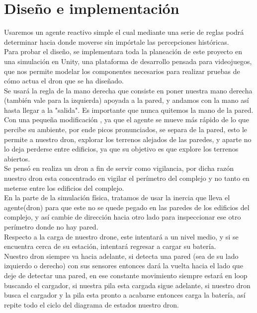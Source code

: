 \documentclass[12pt]{article}
\begin{document}
\section{Diseño e implementación}

Usaremos un agente reactivo simple el cual mediante una serie de reglas podrá determinar
hacia donde moverse sin impórtale las percepciones históricas.\\

Para probar el diseño, se implementara toda la planeación de este proyecto en una simulación en Unity, una plataforma de desarrollo pensada para videojuegos, que nos permite modelar los componentes necesarios para realizar pruebas de cómo actua el dron que se ha diseñado.\\


Se usará la regla de la mano derecha que consiste en poner nuestra mano derecha (también
vale para la izquierda) apoyada a la pared, y andamos con la mano así hasta llegar a la "salida". Es
importante que nunca quitemos la mano de la pared. Con una pequeña modificación , ya que el agente se mueve más rápido de lo que percibe su ambiente, por ende picos pronunciados, se separa de la pared, esto le permite a nuestro dron, explorar los terrenos alejados de las paredes, y aparte no lo deja perderse entre edificios, ya que su objetivo es que explore los terrenos abiertos. \\

Se pensó en realiza un dron a fin de servir como vigilancia, por dicha razón nuestro dron esta concentrado en vigilar el perímetro del complejo y no tanto en meterse entre los edificios del complejo.\\

En la parte de la simulación física, tratamos de usar la inercia que lleva el agente(dron) para que este no se quede pegado en las paredes de los edificios del complejo, y así cambie de dirección hacia otro lado para inspeccionar ese otro perímetro donde no hay pared.\\

Respecto a la carga de nuestro drone, este intentará a un nivel medio, y si se encuentra cerca de su estación, intentará regresar a cargar su batería.\\

Nuestro dron siempre va hacia adelante, si detecta una pared (sea de su lado izquierdo o derecho) con sus sensores entonces dará la vuelta hacia el lado que deje de detectar una pared, en ese constante movimiento siempre estará en loop buscando el cargador, si nuestra pila esta cargada sigue adelante, si nuestro dron busca el cargador y la pila esta pronto a acabarse entonces carga la batería, así repite todo el ciclo del diagrama de estados nuestro dron.\\
\end{document}
